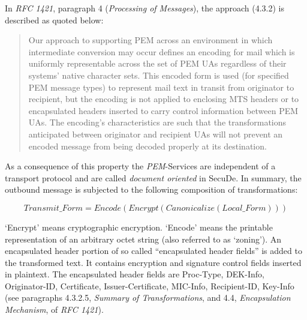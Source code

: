 In {\em RFC 1421}, paragraph 4 ({\em Processing of Messages}),
the approach (4.3.2) is described as quoted below:

\begin{quote}
Our approach to supporting PEM across an
environment in which intermediate conversion may occur
defines an encoding for mail
which is uniformly representable across the set of PEM UAs
regardless of their systems' native character sets.
This encoded form is used
(for specified PEM message types)
to represent mail text in transit from originator to recipient,
but the encoding is not applied to enclosing MTS headers
or to encapsulated headers
inserted to carry control information between PEM UAs.
The encoding's characteristics are such that the transformations
anticipated between originator and recipient UAs will not prevent
an encoded message from being decoded properly at its destination.
\end{quote}

As a consequence of
this property the {\em PEM}-Services are independent of a transport
protocol and are called
{\em document oriented} in SecuDe.
In summary, the outbound message is subjected to the following
composition of transformations:

\begin{displaymath}
Transmit\_Form=Encode(Encrypt(Canonicalize(Local\_Form)))
\end{displaymath}

`Encrypt' means cryptographic encryption.
`Encode' means the printable representation of an arbitrary octet string
(also referred to as `zoning').
An encapsulated header portion of so called
``encapsulated header fields''
is added to the transformed text.
It contains encryption and signature control fields inserted in plaintext.
The encapsulated header fields are
Proc-Type, DEK-Info, Originator-ID,
Certificate, Issuer-Certificate, MIC-Info,
Recipient-ID, Key-Info
(see paragraphs 4.3.2.5, {\em Summary of Transformations},
and 4.4, {\em Encapsulation Mechanism},
of {\em RFC 1421}).

